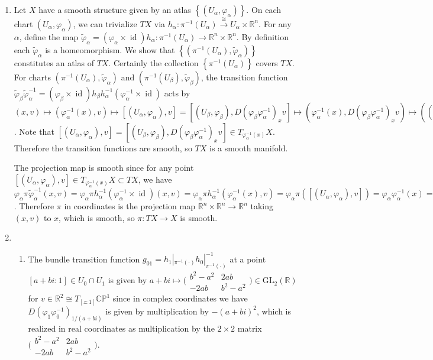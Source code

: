 \documentclass[11pt,leqno]{article}
\theoremstyle{plain}
\theoremstyle{definition}
\numberwithin{equation}{section}
\numberwithin{lem}{section}
\newcommand{\cbr}[1]{\left\{#1\right\}}
\DeclareMathOperator{\id}{id}
\newcommand{\GL}{\mathrm{GL}}
\begin{document}
\begin{enumerate}
    \item Let $X$ have a smooth structure given by an atlas $\cbr{(U_\alpha,\varphi_\alpha)}$. On each chart $(U_\alpha,\varphi_\alpha)$, we can trivialize $TX$ via $h_\alpha\colon \pi^{-1}(U_\alpha)\xrightarrow{\cong} U_\alpha\times \mathbb R^n$. For any $\alpha$, define the map $\tilde\varphi_\alpha = (\varphi_\alpha\times \id)h_\alpha \colon \pi^{-1}(U_\alpha) \to \mathbb R^n\times \mathbb R^n$. By definition each $\tilde\varphi_\alpha$ is a homeomorphism. We show that $\cbr{(\pi^{-1}(U_\alpha), \tilde\varphi_\alpha)}$ constitutes an atlas of $TX$. Certainly the collection $\cbr{\pi^{-1}(U_\alpha)}$ covers $TX$. For charts $(\pi^{-1}(U_\alpha), \tilde\varphi_\alpha)$ and $(\pi^{-1}(U_\beta), \tilde\varphi_\beta)$, the transition function $\tilde\varphi_\beta\tilde\varphi_\alpha^{-1} = (\varphi_\beta\times \id)h_\beta h_\alpha^{-1}(\varphi_\alpha^{-1}\times\id)$ acts by $(x,v)\mapsto (\varphi_\alpha^{-1}(x),v)\mapsto [(U_\alpha,\varphi_\alpha),v] = [(U_\beta,\varphi_\beta),D(\varphi_\beta\varphi_\alpha^{-1})_{x}v]\mapsto (\varphi_\alpha^{-1}(x),D(\varphi_\beta\varphi_\alpha^{-1})_{x}v)\mapsto ((\varphi_\beta\varphi_\alpha^{-1})(x),D(\varphi_\beta\varphi_\alpha^{-1})_{x}v)$. Note that $[(U_\alpha,\varphi_\alpha),v] = [(U_\beta,\varphi_\beta),D(\varphi_\beta\varphi_\alpha^{-1})_{x}v]\in T_{\varphi_\alpha^{-1}(x)}X$. Therefore the transition functions are smooth, so $TX$ is a smooth manifold.
    
    The projection map is smooth since for any point $[(U_\alpha,\varphi_\alpha),v]\in T_{\varphi_\alpha^{-1}(x)}X\subset TX$, we have $\varphi_\alpha \pi \tilde\varphi_\alpha^{-1}(x,v) = \varphi_\alpha\pi h_\alpha^{-1}(\varphi_\alpha^{-1}\times \id)(x,v) = \varphi_\alpha\pi h_\alpha^{-1}(\varphi_\alpha^{-1}(x),v) = \varphi_\alpha\pi([(U_\alpha,\varphi_\alpha),v]) = \varphi_\alpha\varphi_\alpha^{-1}(x) = x$. Therefore $\pi$ in coordinates is the projection map $\mathbb R^n\times \mathbb R^n\to \mathbb R^n$ taking $(x,v)$ to $x$, which is smooth, so $\pi\colon TX\to X$ is smooth.
    \item \begin{enumerate}
        \item The bundle transition function $g_{01} = h_1|_{\pi^{-1}(\cdot)}h_0|_{\pi^{-1}(\cdot)}^{-1}$ at a point $[a+bi:1]\in U_0\cap U_1$ is given by $a+bi\mapsto \big(\!\begin{smallmatrix}
            b^2-a^2 & 2ab \\ -2ab & b^2-a^2
        \end{smallmatrix}\!\big)\in \GL_2(\mathbb R)$ for $v\in \mathbb R^2 \cong T_{[z:1]}\mathbb{CP}^1$ since in complex coordinates we have $D(\varphi_1\varphi_0^{-1})_{1/(a+bi)}$ is given by multiplication by $ -(a+bi)^2$, which is realized in real coordinates as multiplication by the $2\times 2$ matrix $\big(\!\begin{smallmatrix}
            b^2-a^2 & 2ab \\ -2ab & b^2-a^2
        \end{smallmatrix}\!\big)$. 
        

\end{enumerate}
\end{enumerate}
\end{document}
